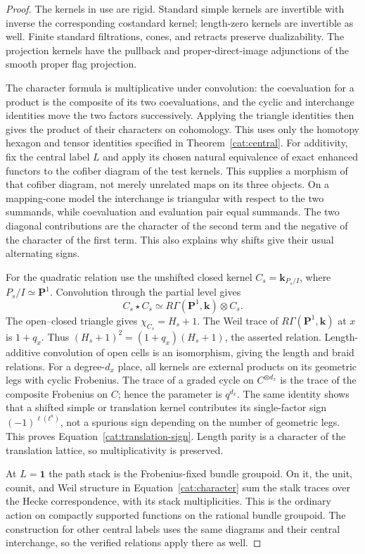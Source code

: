 \begin{proof}
The kernels in use are rigid. Standard simple kernels are
invertible with inverse the corresponding costandard kernel;
length-zero kernels are invertible as well. Finite standard
filtrations, cones, and retracts preserve dualizability. The
projection kernels have the pullback and proper-direct-image
adjunctions of the smooth proper flag projection.

The character formula is multiplicative under convolution:
the coevaluation for a product is the composite of its two
coevaluations, and the cyclic and interchange identities move
the two factors successively. Applying the triangle identities
then gives the product of their characters on cohomology. This
uses only the homotopy hexagon and tensor identities specified
in Theorem~\ref{cat:central}. For additivity, fix the central
label $L$ and apply its chosen natural equivalence of exact
enhanced functors to the cofiber diagram of the test kernels.
This supplies a morphism of that cofiber diagram, not merely
unrelated maps on its three objects. On a mapping-cone model
the interchange is triangular with respect to the two summands, while
coevaluation and evaluation pair equal summands. The two
diagonal contributions are the character of the second term
and the negative of the character of the first term. This
also explains why shifts give their usual alternating signs.

For the quadratic relation use the unshifted closed kernel
$C_s=\mathbf k_{P_s/I}$, where $P_s/I\simeq\mathbf P^1$.
Convolution through the partial level gives
\[
 C_s\star C_s\simeq
 R\Gamma(\mathbf P^1,\mathbf k)\otimes C_s.
\]
The open--closed triangle gives $\chi_{C_s}=H_s+1$.
The Weil trace of $R\Gamma(\mathbf P^1,\mathbf k)$ at $x$
is $1+q_x$. Thus $(H_s+1)^2=(1+q_x)(H_s+1)$, the asserted
relation. Length-additive convolution of open cells is an
isomorphism, giving the length and braid relations. For a
degree-$d_x$ place, all kernels are external products on its
geometric legs with cyclic Frobenius. The trace of a graded
cycle on $C^{\otimes d_x}$ is the trace of the composite
Frobenius on $C$; hence the parameter is $q^{d_x}$.
The same identity shows that a shifted simple or translation
kernel contributes its single-factor sign
$(-1)^{\ell(t^a)}$, not a spurious sign depending on the
number of geometric legs. This proves
Equation~\eqref{cat:translation-sign}. Length parity is a
character of the translation lattice, so multiplicativity is
preserved.

At $L=\mathbf1$ the path stack is the Frobenius-fixed bundle
groupoid. On it, the unit, counit, and Weil structure in
Equation~\eqref{cat:character} sum the stalk traces over the
Hecke correspondence, with its stack multiplicities. This is
the ordinary action on compactly supported functions on the
rational bundle groupoid. The construction for other central
labels uses the same diagrams and their central interchange,
so the verified relations apply there as well.


\end{proof}
